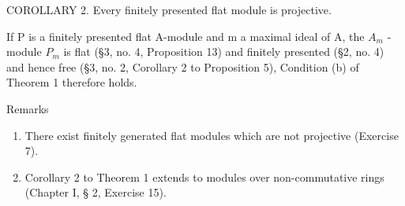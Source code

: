 COROLLARY 2. Every finitely presented flat module is projective.\par

If P is a finitely presented flat A-module and m a maximal ideal of A, the \(A_{m}\) -module \(P_{m}\) is flat (§3, no. 4, Proposition 13) and finitely presented (§2, no. 4) and hence free (§3, no. 2, Corollary 2 to Proposition 5), Condition (b) of Theorem 1 therefore holds.

Remarks

\begin{enumerate}
\def\labelenumi{(\arabic{enumi})}
\item
  There exist finitely generated flat modules which are not projective (Exercise 7).
\item
  Corollary 2 to Theorem 1 extends to modules over non-commutative rings (Chapter I, § 2, Exercise 15).
\end{enumerate}
